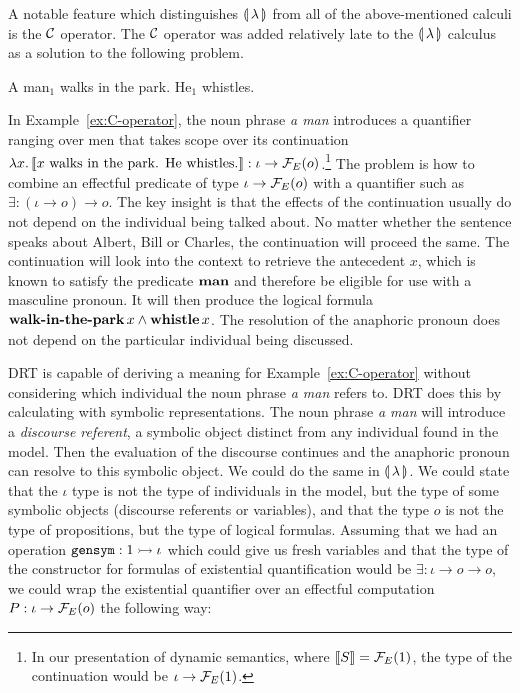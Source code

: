A notable feature which distinguishes ${\llparenthesis \, \lambda \, \rrparenthesis}$ from all of the
above-mentioned calculi is the $\mathcal{C}$ operator. The $\mathcal{C}$ operator was added
relatively late to the ${\llparenthesis \, \lambda \, \rrparenthesis}$ calculus as a solution to the following
problem.

\begin{exe}
  \ex A man$_1$ walks in the park. He$_1$ whistles. \label{ex:C-operator}
\end{exe}

In Example~\ref{ex:C-operator}, the noun phrase \emph{a man} introduces a
quantifier ranging over men that takes scope over its continuation
$\lambda x.\, \llbracket x \text{ walks in the park. He whistles.} \rrbracket : \iota \to
\mathcal{F}_E(o)$.\footnote{In our presentation of dynamic semantics, where
  $\llbracket S \rrbracket = \mathcal{F}_E(1)$, the type of the continuation would be
  $\iota \to \mathcal{F}_E(1)$.} The problem is how to combine an effectful
predicate of type $\iota \to \mathcal{F}_E(o)$ with a quantifier such as
$\exists : (\iota \to o) \to o$. The key insight is that the effects of the
continuation usually do not depend on the individual being talked about. No
matter whether the sentence speaks about Albert, Bill or Charles, the
continuation will proceed the same. The continuation will look into the
context to retrieve the antecedent $x$, which is known to satisfy the
predicate $\textbf{man}$ and therefore be eligible for use with a masculine
pronoun. It will then produce the logical formula
$\textbf{walk-in-the-park}\,x \land \textbf{whistle}\,x$. The
resolution of the anaphoric pronoun does not depend on the particular
individual being discussed.

DRT is capable of deriving a meaning for Example~\ref{ex:C-operator}
without considering which individual the noun phrase \emph{a man} refers
to. DRT does this by calculating with symbolic representations. The noun
phrase \emph{a man} will introduce a \emph{discourse referent}, a symbolic
object distinct from any individual found in the model. Then the evaluation
of the discourse continues and the anaphoric pronoun can resolve to this
symbolic object. We could do the same in ${\llparenthesis \, \lambda \, \rrparenthesis}$. We could state that the
$\iota$ type is not the type of individuals in the model, but the type of
some symbolic objects (discourse referents or variables), and that the type
$o$ is not the type of propositions, but the type of logical
formulas. Assuming that we had an operation $\mathtt{gensym} : 1 \rightarrowtail \iota$
which could give us fresh variables and that the type of the constructor
for formulas of existential quantification would be
$\exists : \iota \to o \to o$, we could wrap the existential quantifier
over an effectful computation $P : \iota \to \mathcal{F}_E(o)$ the following way:

